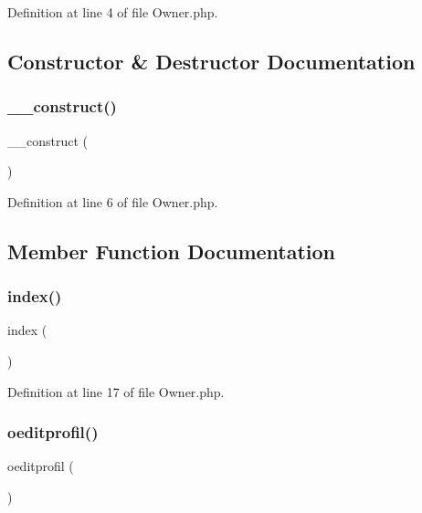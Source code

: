 Definition at line 4 of file Owner.\+php.



\subsection{Constructor \& Destructor Documentation}
\mbox{\label{class_owner_a095c5d389db211932136b53f25f39685}} 
\subsubsection{\texorpdfstring{\_\_construct()}{\_\_construct()}}
{\footnotesize\ttfamily \+\_\+\+\_\+construct (\begin{DoxyParamCaption}{ }\end{DoxyParamCaption})}



Definition at line 6 of file Owner.\+php.



\subsection{Member Function Documentation}
\mbox{\label{class_owner_a149eb92716c1084a935e04a8d95f7347}} 
\subsubsection{\texorpdfstring{index()}{index()}}
{\footnotesize\ttfamily index (\begin{DoxyParamCaption}{ }\end{DoxyParamCaption})}



Definition at line 17 of file Owner.\+php.

\mbox{\label{class_owner_a73b624717b0d784b3797b7c875b27820}} 
\subsubsection{\texorpdfstring{oeditprofil()}{oeditprofil()}}
{\footnotesize\ttfamily oeditprofil (\begin{DoxyParamCaption}{ }\end{DoxyParamCaption})}



